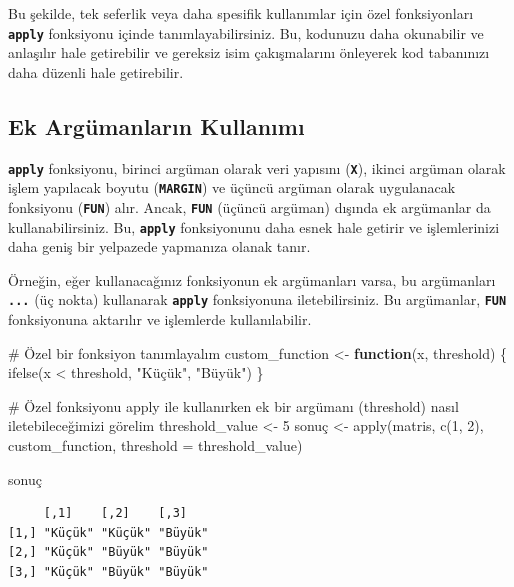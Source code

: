 \documentclass[
  letterpaper,
  DIV=11,
  numbers=noendperiod]{scrreprt}
\newenvironment{Shaded}{\begin{snugshade}}{\end{snugshade}}
\newcommand{\AttributeTok}[1]{\textcolor[rgb]{0.40,0.45,0.13}{#1}}
\newcommand{\CommentTok}[1]{\textcolor[rgb]{0.37,0.37,0.37}{#1}}
\newcommand{\ControlFlowTok}[1]{\textcolor[rgb]{0.00,0.23,0.31}{\textbf{#1}}}
\newcommand{\DecValTok}[1]{\textcolor[rgb]{0.68,0.00,0.00}{#1}}
\newcommand{\FunctionTok}[1]{\textcolor[rgb]{0.28,0.35,0.67}{#1}}
\newcommand{\NormalTok}[1]{\textcolor[rgb]{0.00,0.23,0.31}{#1}}
\newcommand{\OtherTok}[1]{\textcolor[rgb]{0.00,0.23,0.31}{#1}}
\newcommand{\SpecialCharTok}[1]{\textcolor[rgb]{0.37,0.37,0.37}{#1}}
\newcommand{\StringTok}[1]{\textcolor[rgb]{0.13,0.47,0.30}{#1}}
\begin{document}
Bu şekilde, tek seferlik veya daha spesifik kullanımlar için özel
fonksiyonları \textbf{\texttt{apply}} fonksiyonu içinde
tanımlayabilirsiniz. Bu, kodunuzu daha okunabilir ve anlaşılır hale
getirebilir ve gereksiz isim çakışmalarını önleyerek kod tabanınızı daha
düzenli hale getirebilir.

\subsection{Ek Argümanların
Kullanımı}\label{ek-arguxfcmanlarux131n-kullanux131mux131}

\textbf{\texttt{apply}} fonksiyonu, birinci argüman olarak veri yapısını
(\textbf{\texttt{X}}), ikinci argüman olarak işlem yapılacak boyutu
(\textbf{\texttt{MARGIN}}) ve üçüncü argüman olarak uygulanacak
fonksiyonu (\textbf{\texttt{FUN}}) alır. Ancak, \textbf{\texttt{FUN}}
(üçüncü argüman) dışında ek argümanlar da kullanabilirsiniz. Bu,
\textbf{\texttt{apply}} fonksiyonunu daha esnek hale getirir ve
işlemlerinizi daha geniş bir yelpazede yapmanıza olanak tanır.

Örneğin, eğer kullanacağınız fonksiyonun ek argümanları varsa, bu
argümanları \textbf{\texttt{...}} (üç nokta) kullanarak
\textbf{\texttt{apply}} fonksiyonuna iletebilirsiniz. Bu argümanlar,
\textbf{\texttt{FUN}} fonksiyonuna aktarılır ve işlemlerde
kullanılabilir.

\begin{Shaded}
\begin{Highlighting}[]
\CommentTok{\# Özel bir fonksiyon tanımlayalım}
\NormalTok{custom\_function }\OtherTok{\textless{}{-}} \ControlFlowTok{function}\NormalTok{(x, threshold) \{}
  \FunctionTok{ifelse}\NormalTok{(x }\SpecialCharTok{\textless{}}\NormalTok{ threshold, }\StringTok{"Küçük"}\NormalTok{, }\StringTok{"Büyük"}\NormalTok{)}
\NormalTok{\}}

\CommentTok{\# Özel fonksiyonu apply ile kullanırken ek bir argümanı (threshold) nasıl iletebileceğimizi görelim}
\NormalTok{threshold\_value }\OtherTok{\textless{}{-}} \DecValTok{5}
\NormalTok{sonuç }\OtherTok{\textless{}{-}} \FunctionTok{apply}\NormalTok{(matris, }\FunctionTok{c}\NormalTok{(}\DecValTok{1}\NormalTok{, }\DecValTok{2}\NormalTok{), custom\_function, }\AttributeTok{threshold =}\NormalTok{ threshold\_value)}

\NormalTok{sonuç}
\end{Highlighting}
\end{Shaded}

\begin{verbatim}
     [,1]    [,2]    [,3]   
[1,] "Küçük" "Küçük" "Büyük"
[2,] "Küçük" "Büyük" "Büyük"
[3,] "Küçük" "Büyük" "Büyük"
\end{verbatim}
\end{document}
